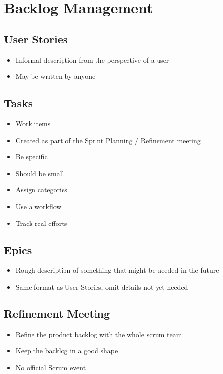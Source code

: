
\section{Backlog Management}
\subsection{User Stories}
\begin{itemize}
    \item Informal description from the perspective of a user
    \item May be written by anyone
\end{itemize}

\subsection{Tasks}
\begin{itemize}
    \item Work items
    \item Created as part of the Sprint Planning / Refinement meeting
    \item Be specific
    \item Should be small
    \item Assign categories
    \item Use a workflow
    \item Track real efforts
\end{itemize}

\subsection{Epics}
\begin{itemize}
    \item Rough description of something that might be needed in the future
    \item Same format as User Stories, omit details not yet needed
\end{itemize}

\subsection{Refinement Meeting}
\begin{itemize}
    \item Refine the product backlog with the whole scrum team
    \item Keep the backlog in a good shape
    \item No official Scrum event
\end{itemize}

